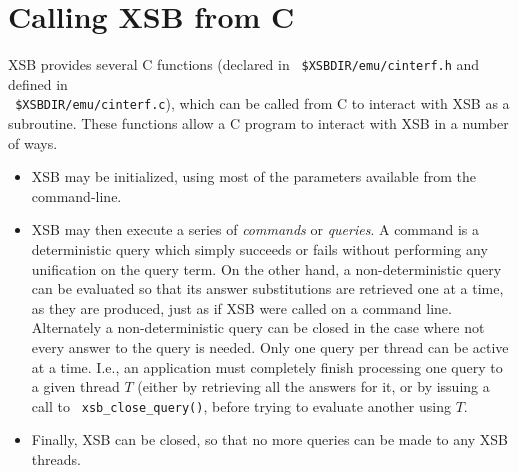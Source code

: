 %
\section{Calling XSB from C}

XSB provides several C functions (declared in {\tt
  \$XSBDIR/emu/cinterf.h} and defined in \\ {\tt
  \$XSBDIR/emu/cinterf.c}), which can be called from C to interact
with XSB as a subroutine. These functions allow a C program to
interact with XSB in a number of ways.
\begin{itemize}
\item XSB may be initialized, using most of the parameters available
  from the command-line. 
%
\item XSB may then execute a series of {\em commands} or {\em
  queries}.  A command is a deterministic query which simply succeeds
  or fails without performing any unification on the query term.  On
  the other hand, a non-deterministic query can be evaluated so that
  its answer substitutions are retrieved one at a time, as they are
  produced, just as if XSB were called on a command line.  Alternately
  a non-deterministic query can be closed in the case where not every
  answer to the query is needed.  Only one query per thread can be
  active at a time.  I.e., an application must completely finish
  processing one query to a given thread $T$ (either by retrieving all
  the answers for it, or by issuing a call to {\tt
    xsb\_close\_query()}, before trying to evaluate another using $T$.
%
\item Finally, XSB can be closed, so that no more queries can be made
  to any XSB threads.
\end{itemize}

